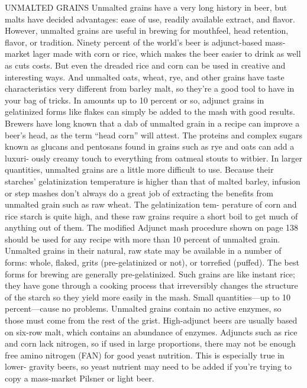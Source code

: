 \documentclass[a4paper,parskip=half]{scrartcl}
\begin{document}
\parencite[67]{Mosher2015}
UNMALTED GRAINS
Unmalted grains have a very long history in beer, but malts have decided
advantages: ease of use, readily available extract, and flavor. However,
unmalted grains are useful in brewing for mouthfeel, head retention, flavor,
or tradition. Ninety percent of the world’s beer is adjunct-based mass-market
lager made with corn or rice, which makes the beer easier to drink as well
as cuts costs. But even the dreaded rice and corn can be used in creative and
interesting ways. And unmalted oats, wheat, rye, and other grains have taste
characteristics very different from barley malt, so they’re a good tool to have
in your bag of tricks.
In amounts up to 10 percent or so, adjunct grains in gelatinized forms like
flakes can simply be added to the mash with good results. Brewers have long
known that a dab of unmalted grain in a recipe can improve a beer’s head, as
the term “head corn” will attest. The proteins and complex sugars known as
glucans and pentosans found in grains such as rye and oats can add a luxuri-
ously creamy touch to everything from oatmeal stouts to witbier.
In larger quantities, unmalted grains are a little more difficult to use.
Because their starches’ gelatinization temperature is higher than that of
malted barley, infusion or step mashes don’t always do a great job of extracting
the benefits from unmalted grain such as raw wheat. The gelatinization tem-
perature of corn and rice starch is quite high, and these raw grains require a
short boil to get much of anything out of them. The modified Adjunct mash
procedure shown on page 138 should be used for any recipe with more than
10 percent of unmalted grain.
Unmalted grains in their natural, raw state may be available in a number
of forms: whole, flaked, grits (pre-gelatinized or not), or torrefied (puffed).
The best forms for brewing are generally pre-gelatinized. Such grains are
like instant rice; they have gone through a cooking process that irreversibly
changes the structure of the starch so they yield more easily in the mash.
Small quantities—up to 10 percent—cause no problems.
Unmalted grains contain no active enzymes, so those must come from the
rest of the grist. High-adjunct beers are usually based on six-row malt, which
contains an abundance of enzymes. Adjuncts such as rice and corn lack
nitrogen, so if used in large proportions, there may not be enough free amino
nitrogen (FAN) for good yeast nutrition. This is especially true in lower-
gravity beers, so yeast nutrient may need to be added if you’re trying to copy
a mass-market Pilsner or light beer.
\end{document}
